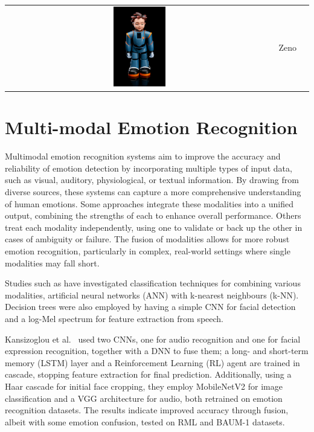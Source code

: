 \begin{table}[ht]
{\begin{tabularx}{1.3\textwidth}{ c|X|X| }
\cline{2-3}
\includegraphics[width=0.2\textwidth]{robot_table/Zeno.png} & Zeno    & \cite{8578328} \\
\cline{2-3}
\end{tabularx}
}
\end{table}
\clearpage{}

\section{Multi-modal Emotion Recognition}
Multimodal emotion recognition systems aim to improve the accuracy and reliability of emotion detection by incorporating multiple types of input data, such as visual, auditory, physiological, or textual information. By drawing from diverse sources, these systems can capture a more comprehensive understanding of human emotions. Some approaches integrate these modalities into a unified output, combining the strengths of each to enhance overall performance. Others treat each modality independently, using one to validate or back up the other in cases of ambiguity or failure. The fusion of modalities allows for more robust emotion recognition, particularly in complex, real-world settings where single modalities may fall short.

Studies such as \cite{Song2018-vu} have investigated classification techniques for combining various modalities, artificial neural networks (ANN) with k-nearest neighbours (k-NN). Decision trees were also employed by \cite{Adiga2020-wv} having a simple CNN for facial detection and a log-Mel spectrum for feature extraction from speech.

Kansizoglou et al.\ \cite{Kansizoglou2022-ih} used two CNNs, one for audio recognition and one for facial expression recognition, together with a DNN to fuse them; a long- and short-term memory (LSTM) layer and a Reinforcement Learning (RL) agent are trained in cascade, stopping feature extraction for final prediction. Additionally, using a Haar cascade for initial face cropping, they employ MobileNetV2 for image classification and a VGG architecture for audio, both retrained on emotion recognition datasets. The results indicate improved accuracy through fusion, albeit with some emotion confusion, tested on RML and BAUM-1 datasets.

